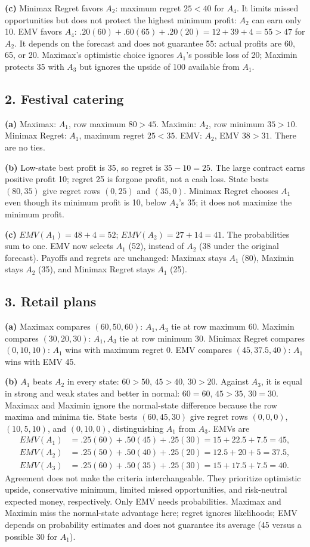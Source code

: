 \textbf{(c)} Minimax Regret favors $A_2$: maximum regret $25<40$ for $A_4$. It limits missed opportunities but does not protect the highest minimum profit: $A_2$ can earn only 10. EMV favors $A_4$: $.20(60)+.60(65)+.20(20)=12+39+4=55>47$ for $A_2$. It depends on the forecast and does not guarantee 55: actual profits are 60, 65, or 20. Maximax's optimistic choice ignores $A_1$'s possible loss of 20; Maximin protects 35 with $A_3$ but ignores the upside of 100 available from $A_1$.

\subsection*{2. Festival catering}
\textbf{(a)} Maximax: $A_1$, row maximum $80>45$. Maximin: $A_2$, row minimum $35>10$. Minimax Regret: $A_1$, maximum regret $25<35$. EMV: $A_2$, EMV $38>31$. There are no ties.

\textbf{(b)} Low-state best profit is 35, so regret is $35-10=25$. The large contract earns positive profit 10; regret 25 is forgone profit, not a cash loss. State bests $(80,35)$ give regret rows $(0,25)$ and $(35,0)$. Minimax Regret chooses $A_1$ even though its minimum profit is 10, below $A_2$'s 35; it does not maximize the minimum profit.

\textbf{(c)} $EMV(A_1)=48+4=52$; $EMV(A_2)=27+14=41$. The probabilities sum to one. EMV now selects $A_1$ (52), instead of $A_2$ (38 under the original forecast). Payoffs and regrets are unchanged: Maximax stays $A_1$ (80), Maximin stays $A_2$ (35), and Minimax Regret stays $A_1$ (25).

\subsection*{3. Retail plans}
\textbf{(a)} Maximax compares $(60,50,60)$: $A_1,A_3$ tie at row maximum 60. Maximin compares $(30,20,30)$: $A_1,A_3$ tie at row minimum 30. Minimax Regret compares $(0,10,10)$: $A_1$ wins with maximum regret 0. EMV compares $(45,37.5,40)$: $A_1$ wins with EMV 45.

\textbf{(b)} $A_1$ beats $A_2$ in every state: $60>50$, $45>40$, $30>20$. Against $A_3$, it is equal in strong and weak states and better in normal: $60=60$, $45>35$, $30=30$. Maximax and Maximin ignore the normal-state difference because the row maxima and minima tie. State bests $(60,45,30)$ give regret rows $(0,0,0)$, $(10,5,10)$, and $(0,10,0)$, distinguishing $A_1$ from $A_3$. EMVs are
\begin{align*}
EMV(A_1)&=.25(60)+.50(45)+.25(30)=15+22.5+7.5=45,\\
EMV(A_2)&=.25(50)+.50(40)+.25(20)=12.5+20+5=37.5,\\
EMV(A_3)&=.25(60)+.50(35)+.25(30)=15+17.5+7.5=40.
\end{align*}
Agreement does not make the criteria interchangeable. They prioritize optimistic upside, conservative minimum, limited missed opportunities, and risk-neutral expected money, respectively. Only EMV needs probabilities. Maximax and Maximin miss the normal-state advantage here; regret ignores likelihoods; EMV depends on probability estimates and does not guarantee its average (45 versus a possible 30 for $A_1$).

